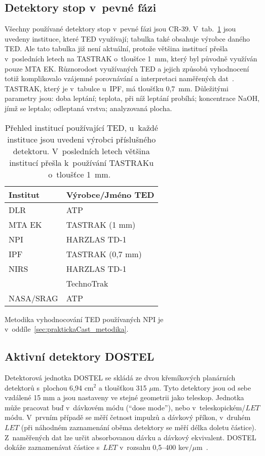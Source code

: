 \subsection{Detektory stop v~pevné fázi}
Všechny používané detektory stop v~pevné fázi jsou CR-39. V~tab.~\ref{tab:dosis_pouzivaneTED} jsou uvedeny instituce, které TED využívají; tabulka také obsahuje výrobce daného TED. Ale tato tabulka již není aktuální, protože většina institucí přešla v~posledních letech na TASTRAK o~tloušťce 1~mm, který byl původně využíván pouze MTA EK. Různorodost využívaných TED a jejich způsobů vyhodnocení totiž komplikovalo vzájemné porovnávání a interpretaci naměřených dat~\cite{cesky}. TASTRAK, který je v~tabulce u~IPF, má tloušťku 0,7~mm. Důležitými parametry jsou: doba leptání; teplota, při níž leptání probíhá; koncentrace NaOH, jímž se leptalo; odleptaná vrstva; analyzovaná plocha.
\begin{table}[h]
  \centering
  \caption{Přehled institucí používající TED, u~každé instituce jsou uvedeni výrobci příslušného detektoru. V~posledních letech většina institucí přešla k~používání TASTRAKu o~tloušťce 1~mm.~\cite{dosis}}
  \label{tab:dosis_pouzivaneTED}
  \begin{tabular}{ll}
	\toprule
	Institut& Výrobce/Jméno TED\\
	\midrule
	DLR&ATP\\
	MTA EK&TASTRAK (1 mm)\\
	NPI&HARZLAS TD-1\\
	IPF&TASTRAK (0,7 mm)\\ 
	NIRS&HARZLAS TD-1\\
		&TechnoTrak\\
	NASA/SRAG&ATP\\
	\bottomrule
  \end{tabular}
\end{table}

Metodika vyhodnocování TED používaných NPI je v~oddíle~\ref{sec:praktickaCast_metodika}.

\subsection{Aktivní detektory DOSTEL}\label{experimentDosis_activeDetectors}
Detektorová jednotka DOSTEL se skládá ze dvou křemíkových planárních detektorů s~plochou  6,94 cm$^2$ a tloušťkou 315 $\mu$m. Tyto detektory jsou od sebe vzdálené 15 mm a jsou nastaveny ve stejné geometrii jako teleskop. Jednotka může pracovat buď v~dávkovém módu (``dose mode''), nebo v~teleskopickém/$\mathit{LET}$ módu. V~prvním případě se měří četnost impulzů a dávkový příkon, v~druhém $\mathit{LET}$ (při náhodném zaznamenání oběma detektory se měří délka doletu částice). Z~naměřených dat lze určit absorbovanou dávku a dávkový ekvivalent. DOSTEL dokáže zaznamenávat částice s~$\mathit{LET}$ v~rozsahu 0,5--400 kev/$\mu$m~\cite{activeDetectors}. 

